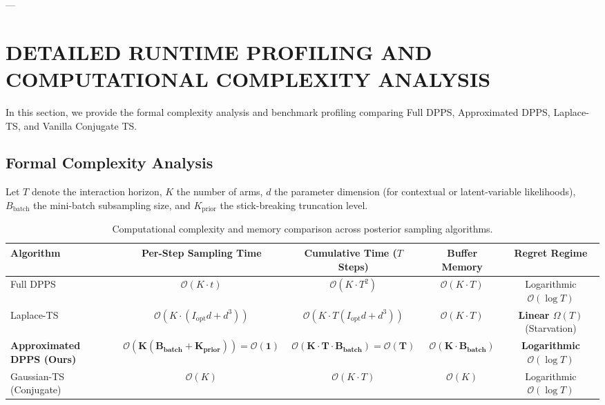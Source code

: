 \documentclass[twoside]{article}
\begin{document}
---

\section{DETAILED RUNTIME PROFILING AND COMPUTATIONAL COMPLEXITY ANALYSIS}
\label{app:runtime_analysis}

In this section, we provide the formal complexity analysis and benchmark profiling comparing Full DPPS, Approximated DPPS, Laplace-TS, and Vanilla Conjugate TS.

\subsection{Formal Complexity Analysis}
Let $T$ denote the interaction horizon, $K$ the number of arms, $d$ the parameter dimension (for contextual or latent-variable likelihoods), $B_{\text{batch}}$ the mini-batch subsampling size, and $K_{\text{prior}}$ the stick-breaking truncation level.

\begin{table}[h]
\centering
\caption{Computational complexity and memory comparison across posterior sampling algorithms.}
\label{tab:complexity_comparison}
\small
\begin{tabular}{lcccc}
\toprule
\textbf{Algorithm} & \textbf{Per-Step Sampling Time} & \textbf{Cumulative Time ($T$ Steps)} & \textbf{Buffer Memory} & \textbf{Regret Regime} \\
\midrule
Full DPPS \citep{vashishtha2025leveraging} & $\mathcal{O}(K \cdot t)$ & $\mathcal{O}(K \cdot T^2)$ & $\mathcal{O}(K \cdot T)$ & Logarithmic $\mathcal{O}(\log T)$ \\
Laplace-TS \citep{chapelle2011empirical} & $\mathcal{O}(K \cdot (I_{\text{opt}} d + d^3))$ & $\mathcal{O}(K \cdot T (I_{\text{opt}} d + d^3))$ & $\mathcal{O}(K \cdot T)$ & \textbf{Linear $\Omega(T)$} (Starvation) \\
\textbf{Approximated DPPS (Ours)} & $\mathbf{\mathcal{O}(K(B_{\text{batch}} + K_{\text{prior}})) = \mathcal{O}(1)}$ & $\mathbf{\mathcal{O}(K \cdot T \cdot B_{\text{batch}}) = \mathcal{O}(T)}$ & $\mathbf{\mathcal{O}(K \cdot B_{\text{batch}})}$ & \textbf{Logarithmic $\mathcal{O}(\log T)$} \\
Gaussian-TS (Conjugate) & $\mathcal{O}(K)$ & $\mathcal{O}(K \cdot T)$ & $\mathcal{O}(K)$ & Logarithmic $\mathcal{O}(\log T)$ \\
\bottomrule
\end{tabular}
\end{table}
\end{document}
